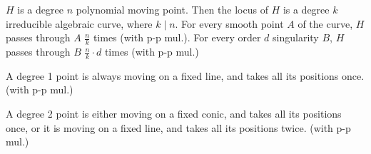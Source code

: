 \documentclass[a4paper]{article}
\begin{document}
\begin{theorem} \label{locus}
    $H$ is a degree $n$ polynomial moving point. Then the locus of $H$ is a degree $k$ irreducible algebraic curve, where $k\mid n$. For every smooth point $A$ of the curve, $H$ passes through $A$ $\frac{n}{k}$ times (with p-p mul.). For every order $d$ singularity $B$, $H$ passes through $B$ $\frac{n}{k}\cdot d$ times (with p-p mul.)
\end{theorem}
\begin{example}
\hfill \break
    A degree 1 point is always moving on a fixed line, and takes all its positions once. (with p-p mul.)

    A degree 2 point is either moving on a fixed conic, and takes all its positions once, or it is moving on a fixed line, and takes all its positions twice. (with p-p mul.)
\end{example}
\end{document}
